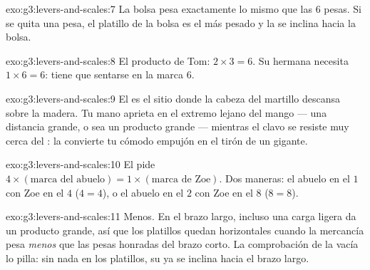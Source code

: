 \begin{solution}{exo:g3:levers-and-scales:7}
La bolsa pesa exactamente lo mismo que las $6$ pesas. Si se quita una
pesa, el platillo de la bolsa es el más pesado y la  se
inclina hacia la bolsa.
\end{solution}

\begin{solution}{exo:g3:levers-and-scales:8}
El producto de Tom: $2 \times 3 = 6$. Su hermana necesita
$1 \times 6 = 6$: tiene que sentarse en la marca $6$.
\end{solution}

\begin{solution}{exo:g3:levers-and-scales:9}
El  es el sitio donde la cabeza del martillo descansa
sobre la madera. Tu mano aprieta en el extremo lejano del mango ---
una distancia grande, o sea un producto grande --- mientras el clavo
se resiste muy cerca del : la  convierte tu
cómodo empujón en el tirón de un gigante.
\end{solution}

\begin{solution}{exo:g3:levers-and-scales:10}
El  pide $4 \times (\text{marca del abuelo}) = 1 \times
(\text{marca de Zoe})$. Dos maneras: el abuelo en el $1$ con Zoe en el
$4$ ($4 = 4$), o el abuelo en el $2$ con Zoe en el $8$ ($8 = 8$).
\end{solution}

\begin{solution}{exo:g3:levers-and-scales:11}
Menos. En el brazo largo, incluso una carga ligera da un producto
grande, así que los platillos quedan horizontales cuando la mercancía
pesa \emph{menos} que las pesas honradas del brazo corto. La
comprobación de la  vacía lo pilla: sin nada en los platillos,
su  ya se inclina hacia el brazo largo.
\end{solution}
